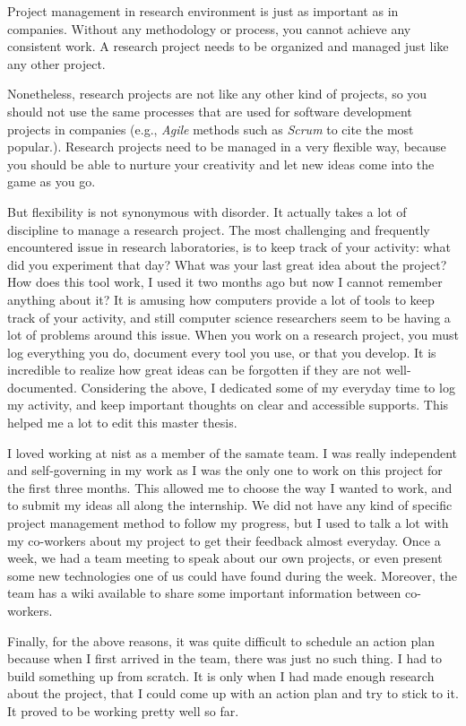 Project management in research environment is just as important as in companies. Without any methodology or process, you cannot achieve any consistent work. A research project needs to be organized and managed just like any other project.

Nonetheless, research projects are not like any other kind of projects, so you should not use the same processes that are used for software development projects in companies (e.g., \emph{Agile} methods such as \emph{Scrum} to cite the most popular.). Research projects need to be managed in a very flexible way, because you should be able to nurture your creativity and let new ideas come into the game as you go.

But flexibility is not synonymous with disorder. It actually takes a lot of discipline to manage a research project. The most challenging and frequently encountered issue in research laboratories, is to keep track of your activity: what did you experiment that day? What was your last great idea about the project? How does this tool work, I used it two months ago but now I cannot remember anything about it? It is amusing how computers provide a lot of tools to keep track of your activity, and still computer science researchers seem to be having a lot of problems around this issue. When you work on a research project, you must log everything you do, document every tool you use, or that you develop. It is incredible to realize how great ideas can be forgotten if they are not well-documented. Considering the above, I dedicated some of my everyday time to log my activity, and keep important thoughts on clear and accessible supports. This helped me a lot to edit this master thesis.

I loved working at \gls{nist} as a member of the \gls{samate} team. I was really independent and self-governing in my work as I was the only one to work on this project for the first three months. This allowed me to choose the way I wanted to work, and to submit my ideas all along the internship. We did not have any kind of specific project management method to follow my progress, but I used to talk a lot with my co-workers about my project to get their feedback almost everyday. Once a week, we had a team meeting to speak about our own projects, or even present some new technologies one of us could have found during the week. Moreover, the team has a wiki available to share some important information between co-workers.

Finally, for the above reasons, it was quite difficult to schedule an action plan because when I first arrived in the team, there was just no such thing. I had to build something up from scratch. It is only when I had made enough research about the project, that I could come up with an action plan and try to stick to it. It proved to be working pretty well so far.